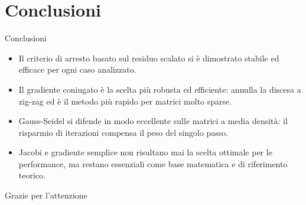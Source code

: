 \documentclass[11pt,aspectratio=169,xcolor=dvipsnames]{beamer}
\begin{document}
\section{Conclusioni}

\begin{frame}{Conclusioni}
    \begin{itemize}
        \item Il criterio di arresto basato sul residuo scalato si è dimostrato stabile ed efficace per ogni caso analizzato.
        \item Il gradiente coniugato è la scelta più robusta ed efficiente: annulla la discesa a zig-zag ed è il metodo più rapido per matrici molto sparse.
        \item Gauss-Seidel si difende in modo eccellente sulle matrici a media densità: il risparmio di iterazioni compensa il peso del singolo passo.
        \item Jacobi e gradiente semplice non risultano mai la scelta ottimale per le performance, ma restano essenziali come base matematica e di riferimento teorico.
    \end{itemize}
\end{frame}

\begin{frame}[plain]
    \begin{center}
        \Huge{Grazie per l'attenzione}
    \end{center}
\end{frame}
\end{document}
